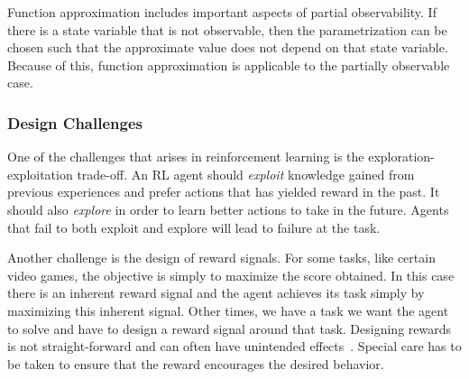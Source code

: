 Function approximation includes important aspects of partial observability.
If there is a state variable that is not observable,
then the parametrization can be chosen such that the approximate value does not depend on that state variable.
Because of this, function approximation is applicable to the partially observable case.




\subsubsection{Design Challenges}


One of the challenges that arises in reinforcement learning is the exploration-exploitation trade-off.
An RL agent should \textit{exploit} knowledge gained from previous experiences and prefer actions that has yielded reward in the past.
It should also \textit{explore} in order to learn better actions to take in the future.
Agents that fail to both exploit and explore will lead to failure at the task.

Another challenge is the design of reward signals.
For some tasks, like certain video games, the objective is simply to maximize the score obtained.
In this case there is an inherent reward signal and the agent achieves its task simply by maximizing this inherent signal.
Other times, we have a task we want the agent to solve and have to design a reward signal around that task.
Designing rewards is not straight-forward and can often have unintended effects~\cite{sutton_reinforcement_2018}.
Special care has to be taken to ensure that the reward encourages the desired behavior.

